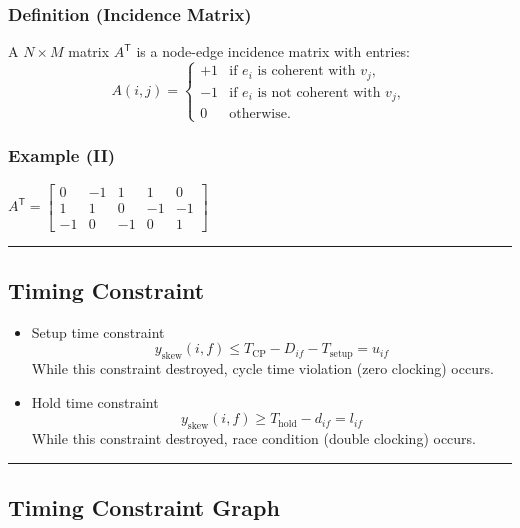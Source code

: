 \documentclass[
]{article}
\providecommand{\tightlist}{%
  \setlength{\itemsep}{0pt}\setlength{\parskip}{0pt}}
\begin{document}
\subsubsection{Definition (Incidence Matrix)}\label{definition-incidence-matrix}

A \(N \times M\) matrix \(A^\mathsf{T}\) is a node-edge incidence matrix
with entries: \[A(i,j) = \begin{cases}
  +1 & \text{if $e_i$ is coherent with $v_j$}, \\
  -1 & \text{if $e_i$ is not coherent with $v_j$}, \\
   0 & \text{otherwise.}
  \end{cases}\]

\subsubsection{Example (II)}\label{example-ii}

\(A^\mathsf{T} = \begin{bmatrix} 0 & -1 & 1 & 1 & 0 \\ 1 & 1 & 0 & -1 & -1 \\ -1 & 0 & -1 & 0 & 1 \end{bmatrix}\)

\begin{center}\rule{0.5\linewidth}{0.5pt}\end{center}

\subsection{Timing Constraint}\label{timing-constraint}

\begin{itemize}
\tightlist
\item
  Setup time constraint
  \[y_\text{skew}(i,f) \le T_\text{CP} - D_{if} - T_\text{setup} = u_{if}\]
  While this constraint destroyed, cycle time violation (zero
  clocking) occurs.
\item
  Hold time constraint
  \[y_\text{skew}(i,f) \ge T_\text{hold} - d_{if} = l_{if}\] While
  this constraint destroyed, race condition (double clocking) occurs.
\end{itemize}

\begin{center}\rule{0.5\linewidth}{0.5pt}\end{center}

\subsection{Timing Constraint Graph}\label{timing-constraint-graph}
\end{document}
